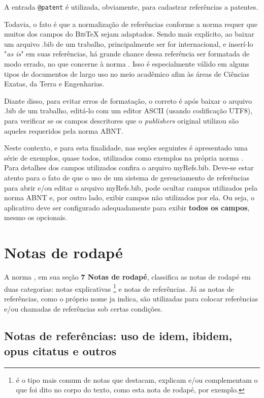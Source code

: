 \begin{apendicesenv}
A entrada \verb|@patent| é utilizada, obviamente, para cadastrar referências a
patentes.

Todavia, o fato é que a normalização de referências conforme a norma
 requer que muitos dos campos do \textsc{Bib}\TeX{}
sejam adaptados. Sendo mais explícito, ao baixar um arquivo {\ttfamily .bib} de
um trabalho, principalmente ser for internacional, e inserí-lo
"\textit{as is}"{} em suas referências, há grande chance dessa referência ser
formatada de modo errado, no que concerne à norma .
Isso é especialmente válido em alguns tipos de documentos de largo uso no meio
acadêmico afim às áreas de Ciências Exatas, da Terra e Engenharias.

Diante disso, para evitar erros de formatação, o correto é após baixar o arquivo
{\ttfamily .bib} de um trabalho, editá-lo com um editor ASCII (usando
codificação UTF8), para verificar se os campos descritores que o
\textit{publishers} original utilizou são aqueles requeridos pela norma ABNT.

Neste contexto, e para esta finalidade, nas seções seguintes é apresentado uma
série de exemplos, quase todos, utilizados como exemplos na própria norma
. Para detalhes dos campos utilizados confira o arquivo
{\ttfamily myRefs.bib}. Deve-se estar atento para o fato de que o uso de um
sistema de gerenciamento de referências para abrir e/ou editar o arquivo
{\ttfamily myRefs.bib}, pode ocultar campos utilizados pela norma ABNT e, por
outro lado, exibir campos não utilizados por ela. Ou seja, o aplicativo deve ser
configurado adequadamente para exibir \textbf{todos os campos}, mesmo os
opcionais.

\section{Notas de rodapé}
\label{sec:notasRodape}

A norma , em sua seção \textbf{7 Notas de rodapé},
classifica as notas de rodapé em duas categorias: notas explicativas
\footnote{é o tipo mais comum de notas que destacam, explicam e/ou complementam
o que foi dito no corpo do texto, como esta nota de rodapé, por exemplo.} e
notas de referências. Já as notas de referências, como o próprio nome ja indica,
são utilizadas para colocar referências e/ou chamadas de referências sob certas
condições.

\subsection{Notas de referências: uso de idem, ibidem, opus citatus e outros}
\label{subsec:notasRefs}


\end{apendicesenv}
